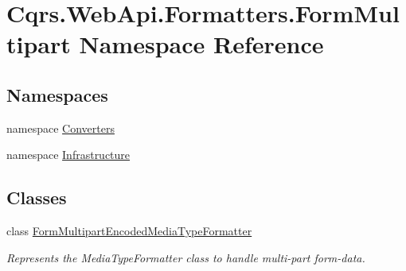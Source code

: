\hypertarget{namespaceCqrs_1_1WebApi_1_1Formatters_1_1FormMultipart}{}\section{Cqrs.\+Web\+Api.\+Formatters.\+Form\+Multipart Namespace Reference}
\label{namespaceCqrs_1_1WebApi_1_1Formatters_1_1FormMultipart}
\subsection*{Namespaces}
\begin{DoxyCompactItemize}
\item 
namespace \hyperlink{namespaceCqrs_1_1WebApi_1_1Formatters_1_1FormMultipart_1_1Converters}{Converters}
\item 
namespace \hyperlink{namespaceCqrs_1_1WebApi_1_1Formatters_1_1FormMultipart_1_1Infrastructure}{Infrastructure}
\end{DoxyCompactItemize}
\subsection*{Classes}
\begin{DoxyCompactItemize}
\item 
class \hyperlink{classCqrs_1_1WebApi_1_1Formatters_1_1FormMultipart_1_1FormMultipartEncodedMediaTypeFormatter}{Form\+Multipart\+Encoded\+Media\+Type\+Formatter}
\begin{DoxyCompactList}\small\item\em Represents the Media\+Type\+Formatter class to handle multi-\/part form-\/data. \end{DoxyCompactList}\end{DoxyCompactItemize}
